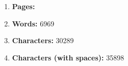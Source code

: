 \begin{enumerate}[itemsep = 0.1 pt]

      \item{
            \textbf{Pages:} 
            }




      \item{
            \textbf{Words:} 6969
            }

      \item{
            \textbf{Characters:} 30289
            }
      \item{
            \textbf{Characters (with spaces):} 35898
            }

\end{enumerate}